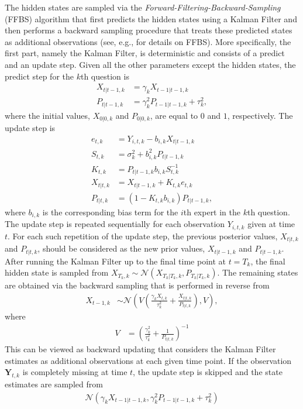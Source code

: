 \documentclass[aoas, preprint]{imsart}
\numberwithin{equation}{section}
\theoremstyle{plain}
\begin{document}
\begin{center}
\end{center}
The hidden states are sampled via the \textit{Forward-Filtering-Backward-Sampling} (FFBS) algorithm that first predicts the hidden states using a Kalman Filter and then performs a backward sampling procedure that treats these predicted states as additional observations (see, e.g., \cite{carter1994gibbs, migon2005dynamic} for details on FFBS). More specifically, the first part, namely the Kalman Filter, is deterministic and consists of a predict and an update step. Given all the other parameters except the hidden states, the predict step for the $k$th question is
\begin{align*}
X_{t|t-1,k} &= \gamma_k X_{t-1|t-1,k} \\
P_{t|t-1, k} &= \gamma_k^2 P_{t-1|t-1, k} + \tau_k^2,
\end{align*}
where the initial values, $X_{0|0,k}$ and $P_{0|0, k}$, are equal to $0$ and $1$, respectively. The update step is 
\begin{align*}
e_{t,k} &= Y_{i,t,k} - b_{i,k} X_{t | t-1, k} \\
S_{t,k} &=  \sigma_k^2 + b_{i,k}^2 P_{t|t-1, k}\\
K_{t,k} &=  P_{t|t-1, k} b_{i,k} S_{t,k}^{-1} \\
X_{t|t, k} &= X_{t|t-1, k} + K_{t,k} e_{t,k} \\
P_{t|t,k} &= (1 - K_{t,k} b_{i,k}) P_{t|t-1,k},
\end{align*}
where $b_{i,k}$ is the corresponding bias term for the $i$th expert in the $k$th question. The update step is repeated sequentially for each observation $Y_{i,t,k}$ given at time $t$. For each such repetition of the update step, the previous posterior values, $X_{t|t, k}$ and $P_{t|t, k}$, should be considered as the new prior values, $X_{t|t-1, k}$ and $P_{t|t-1, k}$. After running the Kalman Filter up to the final time point at $t = T_k$, the final hidden state is sampled from $X_{T_k,k} \sim \mathcal{N}(X_{T_k|T_k, k}, P_{T_k|T_k, k})$. The remaining states are obtained via the backward sampling that is performed in reverse from
\begin{align*}
X_{t-1, k} &\sim  \mathcal{N} \left(V\left( \frac{\gamma_kX_{t,k}}{\tau_k^2}  + \frac{X_{t|t,k}}{P_{t|t,k} } \right),  V\right),
\end{align*}
where
\begin{align*}
V &= \left( \frac{\gamma_k^2}{\tau_k^2} + \frac{1}{P_{t|t,k}}\right)^{-1}
\end{align*}
This can be viewed as backward updating that considers the Kalman Filter estimates as additional observations at each given time point. If the observation $\boldsymbol{Y}_{t,k}$ is completely missing at time $t$, the update step is skipped and the state estimates are sampled from
\begin{align*}
\mathcal{N}\left(\gamma_k X_{t-1|t-1,k}, \gamma_k^2 P_{t-1|t-1,k} + \tau_k^2\right)
\end{align*}
\end{document}
